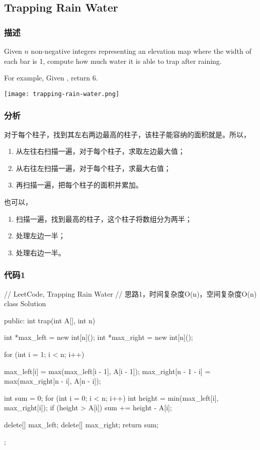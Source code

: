 \subsection{Trapping Rain Water} %
\label{sec:trapping-rain-water}


\subsubsection{描述}
Given $n$ non-negative integers representing an elevation map where the width 
of each bar is 1, compute how much water it is able to trap after raining.

For example, 
Given \code{[0,1,0,2,1,0,1,3,2,1,2,1]}, return 6.

\begin{center}
	\texttt{[image: trapping-rain-water.png]}\\
	\label{fig:trapping-rain-water}
\end{center}


\subsubsection{分析}
对于每个柱子，找到其左右两边最高的柱子，该柱子能容纳的面积就是。所以，
\begin{enumerate}
	\item 从左往右扫描一遍，对于每个柱子，求取左边最大值；
	\item 从右往左扫描一遍，对于每个柱子，求最大右值；
	\item 再扫描一遍，把每个柱子的面积并累加。
\end{enumerate}

也可以，
\begin{enumerate}
	\item 扫描一遍，找到最高的柱子，这个柱子将数组分为两半；
	\item 处理左边一半；
	\item 处理右边一半。
\end{enumerate}


\subsubsection{代码1}
\begin{Code}
	// LeetCode, Trapping Rain Water
	// 思路1，时间复杂度O(n)，空间复杂度O(n)
	class Solution {
		public:
		int trap(int A[], int n) {
			int *max_left = new int[n]();
			int *max_right = new int[n]();
			
			for (int i = 1; i < n; i++) {
				max_left[i] = max(max_left[i - 1], A[i - 1]);
				max_right[n - 1 - i] = max(max_right[n - i], A[n - i]);
				
			}
			
			int sum = 0;
			for (int i = 0; i < n; i++) {
				int height = min(max_left[i], max_right[i]);
				if (height > A[i]) {
					sum += height - A[i];
				}
			}
			
			delete[] max_left;
			delete[] max_right;
			return sum;
		}
	};
\end{Code}


